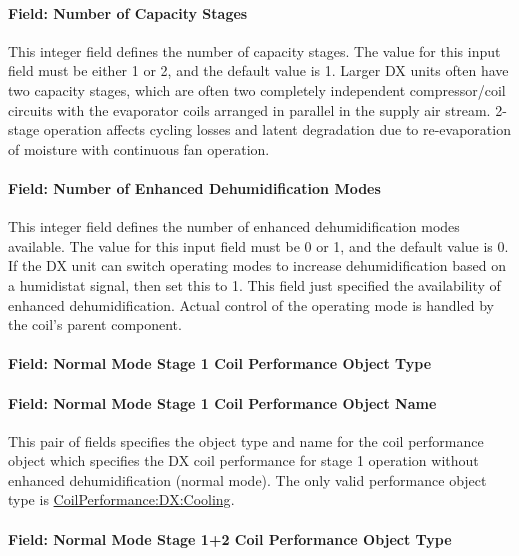 \paragraph{Field: Number of Capacity Stages}\label{field-number-of-capacity-stages}

This integer field defines the number of capacity stages. The value for this input field must be either 1 or 2, and the default value is 1. Larger DX units often have two capacity stages, which are often two completely independent compressor/coil circuits with the evaporator coils arranged in parallel in the supply air stream. 2-stage operation affects cycling losses and latent degradation due to re-evaporation of moisture with continuous fan operation.

\paragraph{Field: Number of Enhanced Dehumidification Modes}\label{field-number-of-enhanced-dehumidification-modes}

This integer field defines the number of enhanced dehumidification modes available. The value for this input field must be 0 or 1, and the default value is 0. If the DX unit can switch operating modes to increase dehumidification based on a humidistat signal, then set this to 1. This field just specified the availability of enhanced dehumidification. Actual control of the operating mode is handled by the coil's parent component.

\paragraph{Field: Normal Mode Stage 1 Coil Performance Object Type}\label{field-normal-mode-stage-1-coil-performance-object-type}

\paragraph{Field: Normal Mode Stage 1 Coil Performance Object Name}\label{field-normal-mode-stage-1-coil-performance-object-name}

This pair of fields specifies the object type and name for the coil performance object which specifies the DX coil performance for stage 1 operation without enhanced dehumidification (normal mode). The only valid performance object type is \hyperref[coilperformancedxcooling]{CoilPerformance:DX:Cooling}.

\paragraph{Field: Normal Mode Stage 1+2 Coil Performance Object Type}\label{field-normal-mode-stage-12-coil-performance-object-type}

